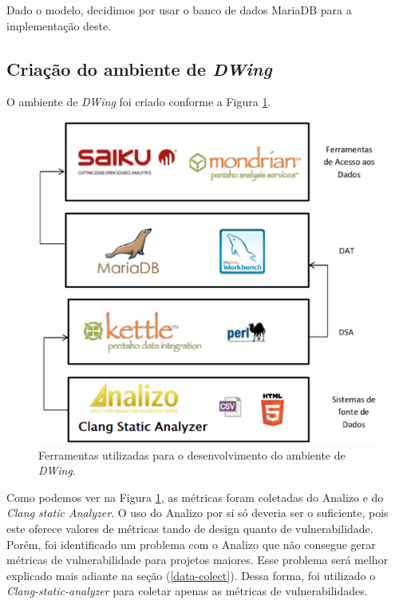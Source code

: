 Dado o modelo, decidimos por usar o banco de dados MariaDB para a implementação deste.


\subsection{Criação do ambiente de \emph{DWing}}

O ambiente de \emph{DWing} foi criado conforme a Figura \ref{dw_components}.

 \begin{figure}[H]
 	\centering
 		\includegraphics[scale=0.5]{figuras/dw_components}
 		\caption{Ferramentas utilizadas para o desenvolvimento do ambiente de \emph{DWing}.}
 		\label{dw_components}
 \end{figure}


Como podemos ver na Figura \ref{dw_components}, as métricas foram coletadas do Analizo e do \emph{Clang static Analyzer}. O uso do Analizo por si só deveria ser o suficiente, pois este oferece valores de métricas tando de design quanto de vulnerabilidade. Porém, foi identificado um problema com o Analizo que não consegue gerar métricas de vulnerabilidade para projetos maiores. Esse problema será melhor explicado mais adiante na seção (\ref{data-colect}). Dessa forma, foi utilizado o \emph{Clang-static-analyzer} para coletar apenas as métricas de vulnerabilidades.

